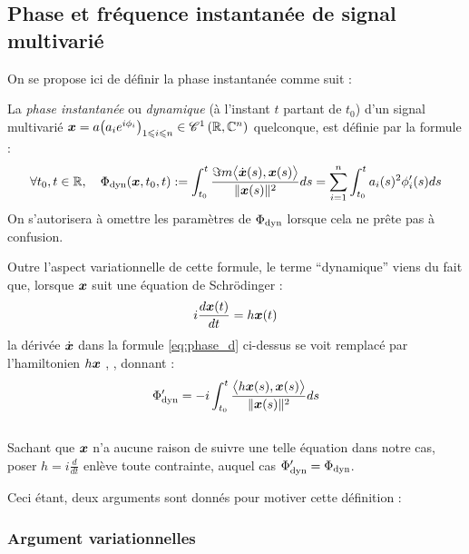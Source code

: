 \subsection{Phase et fréquence instantanée de signal multivarié }\label{subsec:intro_phased}

On se propose ici de définir la phase instantanée comme suit :
\begin{definition} \label{def:phase_d}
	La \emph{phase instantanée} ou \emph{dynamique} (à l'instant $t$ partant de $t_0$) d'un signal multivarié $\x = a\big(a_ie^{i\phi_i}\big)_{1\leq i\leq n} \in \conti[1]{\R}{\C^n}$ quelconque, est définie par la formule :
	\begin{equation} \label{eq:phase_d}
		\forall t_0, t\in\R, \quad \phased(\x, t_0,t) \defeq \int_{t_0}^t \frac{\Im m \big\langle \dot{\x}(s) , \x(s) \big\rangle}{\|\x(s)\|^2} ds =\sum_{i=1}^n \int_{t_0}^t a_i(s)^2 \phi_i'(s)ds
	\end{equation}
	On s'autorisera à omettre les paramètres de $\phased$ lorsque cela ne prête pas à confusion.
\end{definition}

\begin{remarque}
	Outre l'aspect variationnelle de cette formule, le terme ``dynamique'' viens du fait que, lorsque $\x$ suit une équation de Schrödinger :
	\begin{equation}\label{eq:schrodinger}
		i\frac{d \x(t)}{dt} = h\x(t)
	\end{equation}
	la dérivée $\dot{\x}$ dans la formule \eqref{eq:phase_d} ci-dessus se voit remplacé par l'hamiltonien $h\x$ {\normalfont \cite[sec. 2]{bohm_geometric_2003}, \cite[p.~215]{mukunda_quantum_1993}}, donnant :
	\[\phased' = -i \int_{t_0}^t\frac{\big\langle h\x(s) , \x(s) \big\rangle}{\|\x(s)\|^2} ds\] 
	\\
	Sachant que $\x$ n'a aucune raison de suivre une telle équation dans notre cas, poser $h = i\frac{d}{dt}$ enlève toute contrainte, auquel cas $\phased'=\phased$.
\end{remarque}
\skipl

Ceci étant, deux arguments sont donnés pour motiver cette définition :
\\

\subsubsection*{Argument variationnelles}

